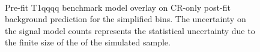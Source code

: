 \begin{figure}[h!]
    \begin{center}
         \\
        \caption{
            Pre-fit T1qqqq benchmark model overlay on CR-only post-fit
            background prediction for the simplified bins. The uncertainty on
            the signal model counts represents the statistical uncertainty due
            to the finite size of the of the simulated sample.
        }
        \label{fig:T1qqqq_MR_simp}
    \end{center}
\end{figure}

